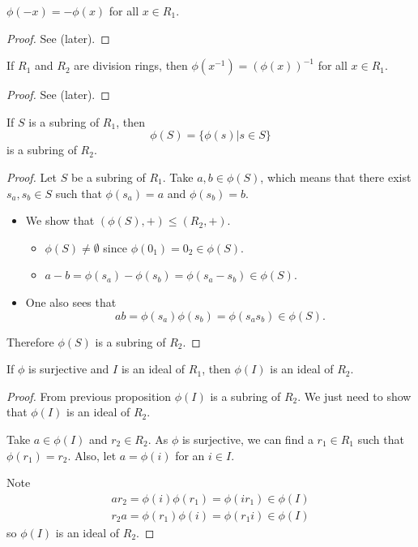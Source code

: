 \begin{proposition}
    $\phi(-x) = -\phi(x)$ for all $x \in R_1$.
\end{proposition}
\begin{proof}
    See  (later).
\end{proof}

\begin{proposition}\label{prop-inverse-under-ring-homomorphism}
    If $R_1$ and $R_2$ are division rings, then $\phi(x^{-1}) = (\phi(x))^{-1}$ for all $x \in R_1$.
\end{proposition}
\begin{proof}
    See  (later).
\end{proof}



\begin{proposition}\label{prop-homomorphism-on-subring-is-subring}
    If $S$ is a subring of $R_1$, then
    \[
        \phi(S) = \{\phi(s) | s \in S\}
    \]
    is a subring of $R_2$.
\end{proposition}
\begin{proof}
    Let $S$ be a subring of $R_1$. Take $a, b \in \phi(S)$, which means that there exist $s_a, s_b\in S$ such that $\phi(s_a) = a$ and $\phi(s_b) = b$.
    \begin{itemize}
        \item We show that $(\phi(S), +) \leq (R_2, +)$.
        \begin{itemize}
            \item $\phi(S) \neq \emptyset$ since $\phi(0_1) = 0_2 \in \phi(S)$.
            \item $a - b = \phi(s_a) - \phi(s_b) = \phi(s_a-s_b) \in \phi(S)$.
        \end{itemize}

        \item One also sees that
        \[
            ab = \phi(s_a)\phi(s_b) = \phi(s_as_b) \in \phi(S).
        \]
    \end{itemize}
    Therefore $\phi(S)$ is a subring of $R_2$.
\end{proof}

\begin{proposition}
    If $\phi$ is surjective and $I$ is an ideal of $R_1$, then $\phi(I)$ is an ideal of $R_2$.
\end{proposition}
\begin{proof}
    From previous proposition $\phi(I)$ is a subring of $R_2$. We just need to show that $\phi(I)$ is an ideal of $R_2$.

    Take $a \in \phi(I)$ and $r_2 \in R_2$. As $\phi$ is surjective, we can find a $r_1 \in R_1$ such that $\phi(r_1) = r_2$. Also, let $a = \phi(i)$ for an $i \in I$.

    Note
    \begin{align*}
        ar_2 = \phi(i)\phi(r_1) = \phi(ir_1) \in \phi(I)\\
        r_2a = \phi(r_1)\phi(i) = \phi(r_1i) \in \phi(I)
    \end{align*}
    so $\phi(I)$ is an ideal of $R_2$.
\end{proof}

